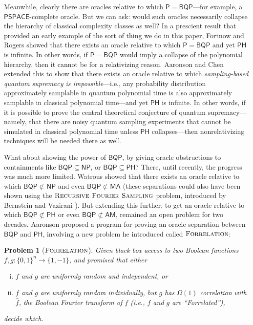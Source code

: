 \documentclass[11pt]{article}%
\newtheorem{problem}[theorem]{Problem}
\newcommand{\Forrelation}{\normalfont\textsc{Forrelation}}
\begin{document}
Meanwhile, clearly there are oracles relative to which $\mathsf{P}=\mathsf{BQP}$---for example, a $\mathsf{PSPACE}$-complete oracle.  But we can ask: would such oracles necessarily collapse the hierarchy of classical complexity classes as well?  In a prescient result that provided an early example of the sort of thing we do in this paper, Fortnow and Rogers \cite{FR98} showed that there exists an oracle relative to which $\mathsf{P}=\mathsf{BQP}$ and yet $\mathsf{PH}$ is infinite.  In other words, if $\mathsf{P}=\mathsf{BQP}$ would imply a collapse of the polynomial hierarchy, then it cannot be for a relativizing reason.  Aaronson and Chen \cite{AC17} extended this to show that there exists an oracle relative to which \textit{sampling-based quantum supremacy is impossible}---i.e., any probability distribution approximately samplable in quantum polynomial time is also approximately samplable in classical polynomial time---and yet $\mathsf{PH}$ is infinite.  In other words, if it is possible to prove the central theoretical conjecture of
quantum supremacy---namely, that there are noisy quantum sampling
experiments that cannot be simulated in classical polynomial time
unless $\mathsf{PH}$ collapses---then nonrelativizing techniques will be needed there as well.

What about showing the power of $\mathsf{BQP}$, by giving oracle obstructions to containments like $\mathsf{BQP}\subseteq\mathsf{NP}$, or $\mathsf{BQP}\subseteq\mathsf{PH}$?  There, until recently, the progress was much more limited.  Watrous \cite{Wat00} showed that there exists an oracle relative to which $\mathsf{BQP}\not\subset\mathsf{NP}$ and even $\mathsf{BQP}\not\subset\mathsf{MA}$ (these separations could also have been shown using the $\textsc{Recursive Fourier Sampling}$ problem, introduced by Bernstein and Vazirani \cite{BV97}).  But extending this further, to get an oracle relative to which $\mathsf{BQP}\not\subset\mathsf{PH}$ or even $\mathsf{BQP}\not\subset\mathsf{AM}$, remained an open problem for two decades.  Aaronson \cite{Aar10} proposed a program for proving an oracle separation between $\mathsf{BQP}$ and $\mathsf{PH}$, involving a new problem he introduced called $\Forrelation$:

\begin{problem}[$\Forrelation$]
Given black-box access to two Boolean functions $f,g:\{0,1\}^n \to \{1,-1\}$, and promised that either
\begin{enumerate}[(i)]
\item $f$ and $g$ are uniformly random and independent, or
\item $f$ and $g$ are uniformly random individually, but $g$ has $\Omega(1)$ correlation with $\hat{f}$, the Boolean Fourier transform of $f$ (i.e., $f$ and $g$ are ``Forrelated''),
\end{enumerate}
decide which.
\end{problem}
\end{document}
